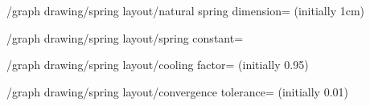 \begin{key}{/graph drawing/spring layout/natural spring
  dimension= (initially 1cm)}

\end{key}

\begin{key}{/graph drawing/spring layout/spring constant=}
\end{key}

\begin{key}{/graph drawing/spring layout/cooling factor=
  (initially 0.95)}
\end{key}

\begin{key}{/graph drawing/spring layout/convergence
  tolerance= (initially 0.01)}
\end{key}

